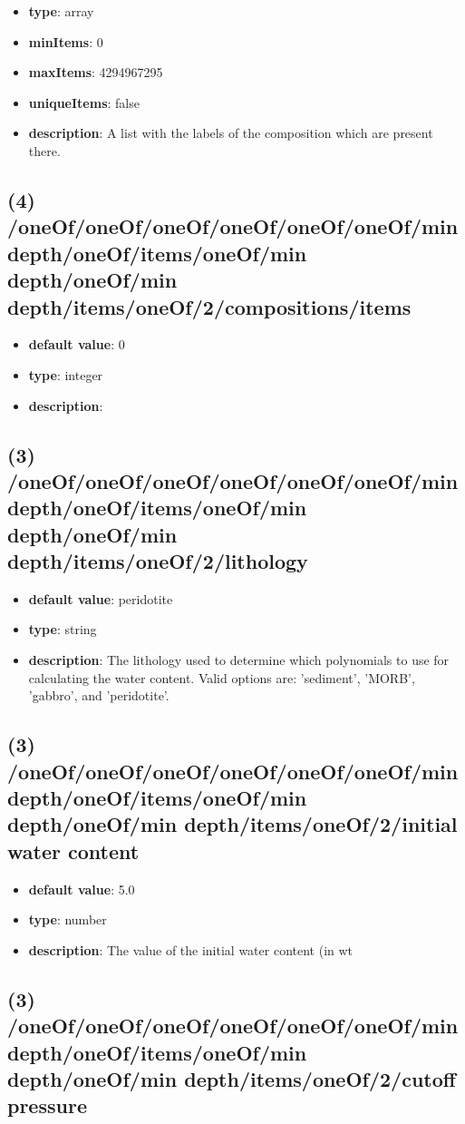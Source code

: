 \begin{itemize}[leftmargin=3em]\item {\bf type}: array
\item {\bf minItems}: 0
\item {\bf maxItems}: 4294967295
\item {\bf uniqueItems}: false
\item {\bf description}: A list with the labels of the composition which are present there.
\end{itemize}\subsection{(4) /oneOf/oneOf/oneOf/oneOf/oneOf/oneOf/min depth/oneOf/items/oneOf/min depth/oneOf/min depth/items/oneOf/2/compositions/items}
\begin{itemize}[leftmargin=4em]\item {\bf default value}: 0
\item {\bf type}: integer
\item {\bf description}: 
\end{itemize}\subsection{(3) /oneOf/oneOf/oneOf/oneOf/oneOf/oneOf/min depth/oneOf/items/oneOf/min depth/oneOf/min depth/items/oneOf/2/lithology}
\begin{itemize}[leftmargin=3em]\item {\bf default value}: peridotite
\item {\bf type}: string
\item {\bf description}: The lithology used to determine which polynomials to use for calculating the water content. Valid options are: 'sediment', 'MORB', 'gabbro', and 'peridotite'.
\end{itemize}\subsection{(3) /oneOf/oneOf/oneOf/oneOf/oneOf/oneOf/min depth/oneOf/items/oneOf/min depth/oneOf/min depth/items/oneOf/2/initial water content}
\begin{itemize}[leftmargin=3em]\item {\bf default value}: 5.0
\item {\bf type}: number
\item {\bf description}: The value of the initial water content (in wt%
\end{itemize}\subsection{(3) /oneOf/oneOf/oneOf/oneOf/oneOf/oneOf/min depth/oneOf/items/oneOf/min depth/oneOf/min depth/items/oneOf/2/cutoff pressure}

